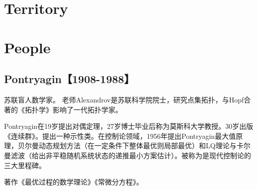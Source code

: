 \documentclass[UTF8]{book}
\begin{document}
\chapter{Territory}


    

\chapter{People}


\section{Pontryagin【1908-1988】}

苏联盲人数学家。
老师Alexandrov是苏联科学院院士，研究点集拓扑，与Hopf合著的《拓扑学》影响了一代拓扑学家。

Pontryagin在19岁提出对偶定理，27岁博士毕业后称为莫斯科大学教授。30岁出版《连续群》。提出一种示性类。在控制论领域，1956年提出Pontryagin最大值原理，贝尔曼动态规划方法（在一定条件下整体最优则局部最优）和LQ理论与卡尔曼滤波（给出非平稳随机系统状态的递推最小方案估计）。被称为是现代控制论的三大里程碑。

著作《最优过程的数学理论》《常微分方程》。
\end{document}
